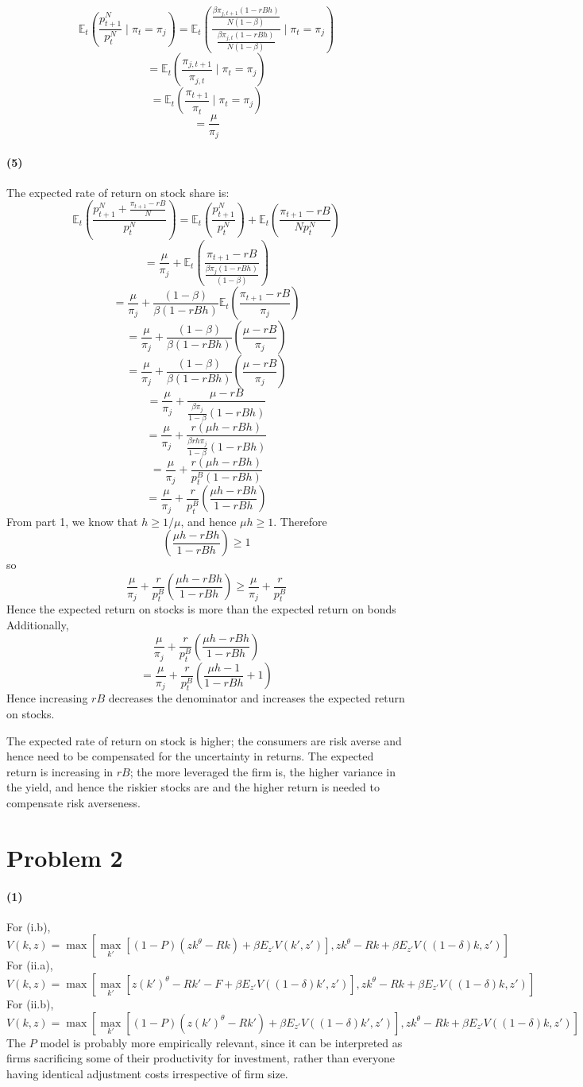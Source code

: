 \documentclass[10pt,letter]{article}
\newcommand{\problem}[1]{\section*{Problem #1}}
\newcommand{\problempart}[1]{\paragraph{#1}}
\begin{document}
\[ \mathbb{E}_t \left( \frac{p^N_{t+1}}{p^N_t} \mid \pi_t = \pi_j \right) = \mathbb{E}_t \left( \frac{\frac{\beta \pi_{j,t+1}(1-rBh)}{N(1-\beta)}}{\frac{\beta \pi_{j,t}(1-rBh)}{N(1-\beta)}} \mid \pi_t = \pi_j \right)  \]
\[ =  \mathbb{E}_t \left( \frac{\pi_{j,t+1}}{\pi_{j,t}} \mid \pi_t = \pi_j \right) \]
\[ =  \mathbb{E}_t \left( \frac{\pi_{t+1}}{\pi_{t}} \mid \pi_t = \pi_j \right) \]
\[ =  \frac{\mu}{\pi_j} \]
\problempart{(5)}
The expected rate of return on stock share is:
\[ \mathbb{E}_t \left(\frac{p^N_{t+1} + \frac{\pi_{t+1} - rB}{N}}{p^N_t} \right) = \mathbb{E}_t\left(\frac{p^N_{t+1} }{p^N_t}\right) + \mathbb{E}_t \left( \frac{\pi_{t+1} - rB}{N p^N_t} \right) \]
\[ = \frac{\mu}{\pi_j} + \mathbb{E}_t \left( \frac{\pi_{t+1} - rB}{\frac{\beta \pi_{j}(1-rBh)}{(1-\beta)}} \right)  \]
\[ = \frac{\mu}{\pi_j} + \frac{(1-\beta)}{\beta(1-rBh)}\mathbb{E}_t \left( \frac{\pi_{t+1} - rB}{\pi_{j}} \right)  \]
\[ = \frac{\mu}{\pi_j} + \frac{(1-\beta)}{\beta(1-rBh)}\left( \frac{\mu - rB}{\pi_{j}} \right)  \]
\[ = \frac{\mu}{\pi_j} + \frac{(1-\beta)}{\beta(1-rBh)}\left( \frac{\mu - rB}{\pi_{j}} \right)  \]
\[ = \frac{\mu}{\pi_j} + \frac{\mu - rB}{\frac{\beta \pi_j}{1-\beta}(1-rBh)} \]
\[ = \frac{\mu}{\pi_j} + \frac{r (\mu h - r B h)}{\frac{\beta r h \pi_j}{1-\beta}(1-rBh)} \]
\[ = \frac{\mu}{\pi_j} + \frac{r (\mu h - r B h)}{p^B_{t}(1-rBh)} \]
\[ = \frac{\mu}{\pi_j} + \frac{r}{p^B_t}\left( \frac{ \mu h - r B h}{1-rBh} \right) \]
From part 1, we know that $h \ge 1/\mu$, and hence $\mu h \ge 1$. Therefore
\[\left( \frac{ \mu h - r B h}{1-rBh} \right) \ge 1 \]
so
\[ \frac{\mu}{\pi_j} + \frac{r}{p^B_t}\left( \frac{ \mu h - r B h}{1-rBh} \right)\ge  \frac{\mu}{\pi_j} + \frac{r}{p^B_t}\]
Hence the expected return on stocks is more than the expected return on bonds
Additionally,
\[ \frac{\mu}{\pi_j} + \frac{r}{p^B_t}\left( \frac{ \mu h - r B h}{1-rBh} \right) \]
\[ = \frac{\mu}{\pi_j} + \frac{r}{p^B_t}\left( \frac{ \mu h - 1}{1-rBh} + 1 \right) \]
Hence increasing $rB$ decreases the denominator and increases the expected return on stocks.

The expected rate of return on stock is higher; the consumers are risk averse and hence need to be compensated for the uncertainty in returns. The expected return is increasing in $rB$; the more leveraged the firm is, the higher variance in the yield, and hence the riskier stocks are and the higher return is needed to compensate risk averseness.

\problem{2}
\problempart{(1)}
For (i.b),
\[ V(k,z) = \max \left[ \max_{k'} \left[(1-P)(zk^\theta - Rk)+ \beta E_{z'}V(k',z') \right], zk^\theta - Rk + \beta E_{z'}V((1-\delta)k, z') \right] \]
For (ii.a),
\[ V(k,z) = \max \left[ \max_{k'} \left[z(k')^\theta - Rk' - F + \beta E_{z'}V((1-\delta)k',z') \right], zk^\theta - Rk + \beta E_{z'}V((1-\delta)k, z') \right] \]
For (ii.b),
\[ V(k,z) = \max \left[ \max_{k'} \left[(1-P)(z(k')^\theta - Rk') + \beta E_{z'}V((1-\delta)k',z') \right], zk^\theta - Rk + \beta E_{z'}V((1-\delta)k, z') \right] \]
The $P$ model is probably more empirically relevant, since it can be interpreted as firms sacrificing some of their productivity for investment, rather than everyone having identical adjustment costs irrespective of firm size.
\end{document}
